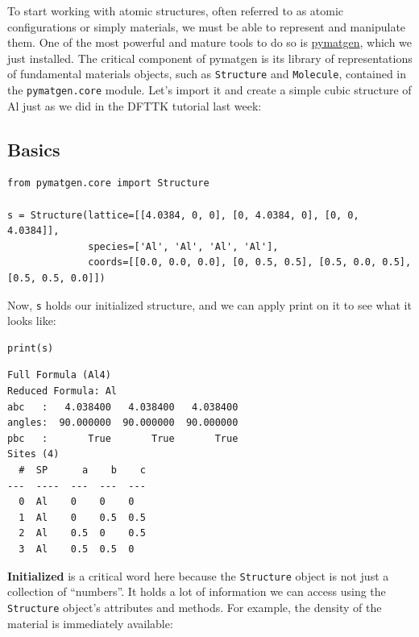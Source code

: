 To start working with atomic structures, often referred to as atomic
configurations or simply materials, we must be able to represent and
manipulate them. One of the most powerful and mature tools to do so is
\href{https://github.com/materialsproject/pymatgen}{pymatgen}, which we
just installed. The critical component of pymatgen is its library of
representations of fundamental materials objects, such as
\texttt{Structure} and
\texttt{Molecule}, contained in the
\texttt{pymatgen.core} module. Let's import it and
create a simple cubic structure of Al just as we did in the DFTTK
tutorial last week:

\hypertarget{basics}{%
\subsection{Basics}\label{pysipfenntutorial:basics}}

\begin{verbatim}
from pymatgen.core import Structure

s = Structure(lattice=[[4.0384, 0, 0], [0, 4.0384, 0], [0, 0, 4.0384]],
              species=['Al', 'Al', 'Al', 'Al'],
              coords=[[0.0, 0.0, 0.0], [0, 0.5, 0.5], [0.5, 0.0, 0.5], [0.5, 0.5, 0.0]])
\end{verbatim}

Now, \texttt{s} holds our initialized structure, and we
can apply print on it to see what it looks like:

\begin{verbatim}
print(s)
\end{verbatim}

\begin{verbatim}
Full Formula (Al4)
Reduced Formula: Al
abc   :   4.038400   4.038400   4.038400
angles:  90.000000  90.000000  90.000000
pbc   :       True       True       True
Sites (4)
  #  SP      a    b    c
---  ----  ---  ---  ---
  0  Al    0    0    0
  1  Al    0    0.5  0.5
  2  Al    0.5  0    0.5
  3  Al    0.5  0.5  0
\end{verbatim}

\textbf{Initialized} is a critical word here because the
\texttt{Structure} object is not just a collection of
``numbers''. It holds a lot of information we can access using the
\texttt{Structure} object's attributes and methods. For
example, the density of the material is immediately available:

